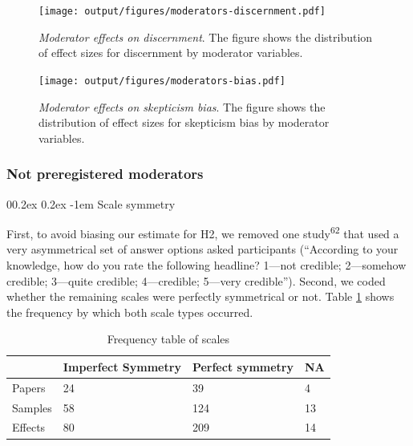 \documentclass[
  man]{apa6}
\makeatletter
\let\oldparagraph\paragraph
\renewcommand{\paragraph}{
    \@ifstar
      \xxxParagraphStar
      \xxxParagraphNoStar
  }
\newcommand{\xxxParagraphStar}[1]{\oldparagraph*{#1}\mbox{}}
\newcommand{\xxxParagraphNoStar}[1]{\oldparagraph{#1}\mbox{}}
\renewcommand{\paragraph}{\@startsection{paragraph}{4}{\parindent}%
  {0\baselineskip \@plus 0.2ex \@minus 0.2ex}%
  {-1em}%
  {\normalfont\normalsize\bfseries\itshape\typesectitle}}
\makeatother
\begin{document}
\begin{figure}
\centering
\texttt{[image: output/figures/moderators-discernment.pdf]}
\caption{\label{fig:moderators-discernment}\emph{Moderator effects on discernment}. The figure shows the distribution of effect sizes for discernment by moderator variables.}
\end{figure}



\begin{figure}
\centering
\texttt{[image: output/figures/moderators-bias.pdf]}
\caption{\label{fig:moderators-bias}\emph{Moderator effects on skepticism bias}. The figure shows the distribution of effect sizes for skepticism bias by moderator variables.}
\end{figure}

\subsubsection{Not preregistered moderators}\label{not-preregistered-moderators}

\paragraph{Scale symmetry}\label{scale-symmetry}

First, to avoid biasing our estimate for H2, we removed one study\textsuperscript{62} that used a very asymmetrical set of answer options asked participants (``According to your knowledge, how do you rate the following headline? 1---not credible; 2---somehow credible; 3---quite credible; 4---credible; 5---very credible''). Second, we coded whether the remaining scales were perfectly symmetrical or not. Table \ref{tab:n-symmetry} shows the frequency by which both scale types occurred.

\begin{table}[tbp]

\begin{center}
\begin{threeparttable}

\caption{\label{tab:n-symmetry}Frequency table of scales}

\begin{tabular}{llll}
\toprule
 & \multicolumn{1}{c}{Imperfect Symmetry} & \multicolumn{1}{c}{Perfect symmetry} & \multicolumn{1}{c}{NA}\\
\midrule
Papers & 24 & 39 & 4\\
Samples & 58 & 124 & 13\\
Effects & 80 & 209 & 14\\
\bottomrule
\end{tabular}

\end{threeparttable}
\end{center}

\end{table}
\end{document}
